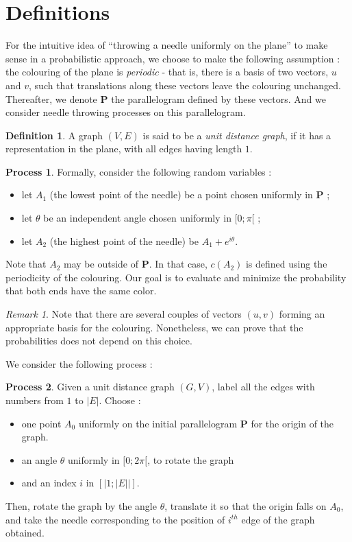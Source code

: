 \documentclass[a4paper,11pt]{article}
\theoremstyle{definition}
\newtheorem{definition}{Definition}
\newtheorem{process}{Process}
\theoremstyle{remark}
\newtheorem{remark}{Remark}
\begin{document}
\section{Definitions}
\label{def}

For the intuitive idea of ``throwing a needle uniformly on the plane'' to make sense in a probabilistic approach, we choose to make the following assumption : 
the colouring of the plane is \textit{periodic} - that is, there is a basis of two vectors, $u$ and $v$, such that translations along these vectors leave the colouring unchanged. Thereafter, we denote $\mathbf{P}$ the parallelogram defined by these vectors. And we consider needle throwing processes on this parallelogram.

\begin{definition}
A graph $(V,E) $ is said to be a \emph{unit distance graph}, if it has a representation in the plane, with all edges having length $1$.
\end{definition}


\begin{process}
Formally, consider the following random variables :
\begin{itemize}
  \item let $A_1$ (the lowest point of the needle) be a point chosen uniformly in $\mathbf{P}$ ;
  \item let $\theta$ be an independent angle chosen uniformly in $[0;\pi[$ ;
  \item let $A_2$ (the highest point of the needle) be $A_1 + e^{i \theta}$.
\end{itemize}
\end{process}

Note that $A_2$ may be outside of $\mathbf{P}$. In that case, $c(A_2)$ is defined using the periodicity of the colouring.
Our goal is to evaluate and minimize the probability that both ends have the same color.

\begin{remark}
Note that there are several couples of vectors $(u,v)$ forming an appropriate basis for the 
colouring. Nonetheless, we can prove that the probabilities does not depend on this choice. 
\end{remark}


We consider the following process : \\
\begin{process}
Given a unit distance graph $(G,V)$, label all the edges with numbers from $1$ to $|E|$. Choose : 
\begin{itemize}
\item one point $A_0$ uniformly on the initial parallelogram $\mathbf{P}$ for the origin of the graph.
\item an angle $\theta$ uniformly in $[0;2\pi[$, to rotate the graph
\item and an index $i$ in $[|1;|E||]$.
\end{itemize}
Then, rotate the graph by the angle $\theta$, translate it so that the origin falls on  $A_0$, and take the needle corresponding to the position of $i^{th}$ edge of the graph obtained. 
\end{process}
\vspace{1 cm} 
\end{document}
